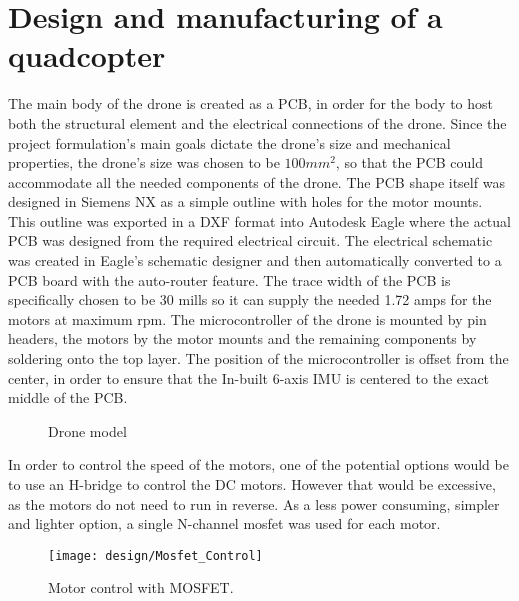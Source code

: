 \section{Design and manufacturing of a quadcopter} 

The main body of the drone is created as a PCB, in order for the body to host both the structural element and the electrical connections of the drone. Since the project formulation’s main goals dictate the drone's size and mechanical properties, the drone's size was chosen to be $100 mm^2$, so that the PCB could accommodate all the needed components of the drone. The PCB shape itself was designed in Siemens NX as a simple outline with holes for the motor mounts. This outline was exported in a DXF format into Autodesk Eagle where the actual PCB was designed from the required electrical circuit. The electrical schematic was created in Eagle’s schematic designer and then automatically converted to a PCB board with the auto-router feature. The trace width of the PCB is specifically chosen to be 30 mills so it can supply the needed 1.72 amps \cite{PCBTracewidth} for the motors at maximum rpm. The microcontroller of the drone is mounted by pin headers, the motors by the motor mounts and the remaining components by soldering onto the top layer. The position of the microcontroller is offset from the center, in order to ensure that the In-built 6-axis IMU is centered to the exact middle of the PCB.

\begin{figure}[H]%
    \centering
    \qquad
    \caption{Drone model}%
    \label{fig:example}%
\end{figure}

In order to control the speed of the motors, one of the potential options would be to use an H-bridge to control
the DC motors. However that would be excessive, as the motors do not need to run in reverse.
As a less power consuming, simpler and lighter option, a single N-channel mosfet was used for each motor.

\begin{figure}[H]
    \begin{center}
    \texttt{[image: design/Mosfet\_Control]}
    \end{center}
    \caption{Motor control with MOSFET.}
    \label{fig:Mosfet_Control}
\end{figure}

